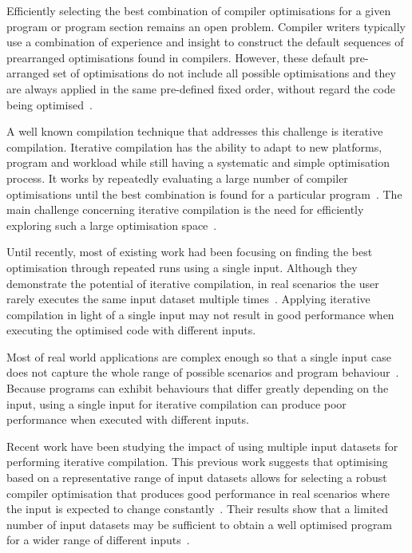 \documentclass[sigplan,10pt]{acmart}
\newcommand{\itercomp}{{iterative compilation}}
\newcommand{\Itercomp}{{Iterative compilation}}
\begin{document}
Efficiently selecting the best combination of compiler optimisations for a given program or program section remains an open problem.
Compiler writers typically use a combination of experience and insight to construct the default sequences of prearranged optimisations found in compilers.
However, these default pre-arranged set of optimisations do not include all possible optimisations and they are always applied in the same pre-defined fixed order, without regard the code being optimised~\cite{pan06,cavazos07,zhou12,kulkarni12}.

A well known compilation technique that addresses this challenge is {\itercomp}.
{\Itercomp} has the ability to adapt to new platforms, program and workload while still having a systematic and simple optimisation process.
It works by repeatedly evaluating a large number of compiler optimisations until the best combination is found for a particular program~\cite{fursin07,chen10}.
The main challenge concerning {\itercomp} is the need for efficiently exploring such a large optimisation space~\cite{fursin07,cavazos07,zhou12}.

Until recently, most of existing work  had been focusing on finding the best optimisation through repeated runs using a single input.
Although they demonstrate the potential of {\itercomp}, in real scenarios the user rarely executes the same input dataset multiple times~\cite{bodin98,kisuki99,stephenson03,kulkarni04,agakov06}.
Applying {\itercomp} in light of a single input may not result in good performance when executing the optimised code with different inputs.

Most of real world applications are complex enough so that a single input case does not capture the whole range of possible scenarios and program behaviour~\cite{haneda06,fursin07,chen10,chen12a}.
Because programs can exhibit behaviours that differ greatly depending on the input,
using a single input for {\itercomp} can produce poor performance when executed with different inputs.

Recent work have been studying the impact of using multiple input datasets
for performing {\itercomp}.
This previous work suggests that optimising based on a representative range of input datasets allows for selecting a robust compiler optimisation that produces good performance in real scenarios where the input is expected to change constantly~\cite{haneda06,fursin07,chen10,chen12a,chen12b,fang15,mpeis16}.
Their results show that a limited number of input datasets may be sufficient to obtain a well optimised program for a wider range of different inputs~\cite{haneda06,fursin07,chen10,chen12a}.
\end{document}
